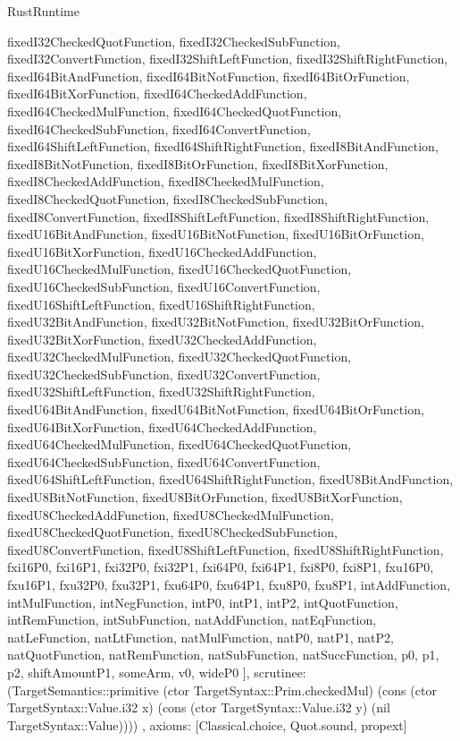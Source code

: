 \begin{lexlean}{RustRuntime}
\begin{semanticmodule}
{{      fixedI32CheckedQuotFunction,
      fixedI32CheckedSubFunction,
      fixedI32ConvertFunction,
      fixedI32ShiftLeftFunction,
      fixedI32ShiftRightFunction,
      fixedI64BitAndFunction,
      fixedI64BitNotFunction,
      fixedI64BitOrFunction,
      fixedI64BitXorFunction,
      fixedI64CheckedAddFunction,
      fixedI64CheckedMulFunction,
      fixedI64CheckedQuotFunction,
      fixedI64CheckedSubFunction,
      fixedI64ConvertFunction,
      fixedI64ShiftLeftFunction,
      fixedI64ShiftRightFunction,
      fixedI8BitAndFunction,
      fixedI8BitNotFunction,
      fixedI8BitOrFunction,
      fixedI8BitXorFunction,
      fixedI8CheckedAddFunction,
      fixedI8CheckedMulFunction,
      fixedI8CheckedQuotFunction,
      fixedI8CheckedSubFunction,
      fixedI8ConvertFunction,
      fixedI8ShiftLeftFunction,
      fixedI8ShiftRightFunction,
      fixedU16BitAndFunction,
      fixedU16BitNotFunction,
      fixedU16BitOrFunction,
      fixedU16BitXorFunction,
      fixedU16CheckedAddFunction,
      fixedU16CheckedMulFunction,
      fixedU16CheckedQuotFunction,
      fixedU16CheckedSubFunction,
      fixedU16ConvertFunction,
      fixedU16ShiftLeftFunction,
      fixedU16ShiftRightFunction,
      fixedU32BitAndFunction,
      fixedU32BitNotFunction,
      fixedU32BitOrFunction,
      fixedU32BitXorFunction,
      fixedU32CheckedAddFunction,
      fixedU32CheckedMulFunction,
      fixedU32CheckedQuotFunction,
      fixedU32CheckedSubFunction,
      fixedU32ConvertFunction,
      fixedU32ShiftLeftFunction,
      fixedU32ShiftRightFunction,
      fixedU64BitAndFunction,
      fixedU64BitNotFunction,
      fixedU64BitOrFunction,
      fixedU64BitXorFunction,
      fixedU64CheckedAddFunction,
      fixedU64CheckedMulFunction,
      fixedU64CheckedQuotFunction,
      fixedU64CheckedSubFunction,
      fixedU64ConvertFunction,
      fixedU64ShiftLeftFunction,
      fixedU64ShiftRightFunction,
      fixedU8BitAndFunction,
      fixedU8BitNotFunction,
      fixedU8BitOrFunction,
      fixedU8BitXorFunction,
      fixedU8CheckedAddFunction,
      fixedU8CheckedMulFunction,
      fixedU8CheckedQuotFunction,
      fixedU8CheckedSubFunction,
      fixedU8ConvertFunction,
      fixedU8ShiftLeftFunction,
      fixedU8ShiftRightFunction,
      fxi16P0,
      fxi16P1,
      fxi32P0,
      fxi32P1,
      fxi64P0,
      fxi64P1,
      fxi8P0,
      fxi8P1,
      fxu16P0,
      fxu16P1,
      fxu32P0,
      fxu32P1,
      fxu64P0,
      fxu64P1,
      fxu8P0,
      fxu8P1,
      intAddFunction,
      intMulFunction,
      intNegFunction,
      intP0,
      intP1,
      intP2,
      intQuotFunction,
      intRemFunction,
      intSubFunction,
      natAddFunction,
      natEqFunction,
      natLeFunction,
      natLtFunction,
      natMulFunction,
      natP0,
      natP1,
      natP2,
      natQuotFunction,
      natRemFunction,
      natSubFunction,
      natSuccFunction,
      p0,
      p1,
      p2,
      shiftAmountP1,
      someArm,
      v0,
      wideP0
    ],
    scrutinee: (TargetSemantics::primitive (ctor TargetSyntax::Prim.checkedMul) (cons (ctor TargetSyntax::Value.i32 x) (cons (ctor TargetSyntax::Value.i32 y) (nil TargetSyntax::Value))))
  },
  axioms: [Classical.choice, Quot.sound, propext]
}


\end{semanticmodule}
\end{lexlean}
